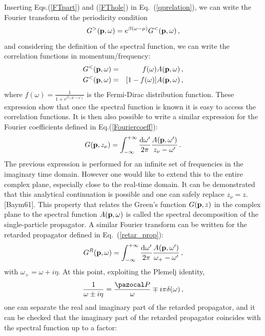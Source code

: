 Inserting Eqs.(\ref{FTpart}) and (\ref{FThole}) in Eq.~(\ref{qprelation}), we can write the Fourier transform of the periodicity condition
\begin{equation}
G^>({\bf p},\omega)=e^{\beta(\omega-\mu)}G^<({\bf p},\omega)\,,
\end{equation}
and considering the definition of the spectral function, we can write the correlation functions in momentum/frequency:
\begin{eqnarray}
\label{FTpart}
G^<({\bf p},\omega) &=& f(\omega)A({\bf p},\omega)\,,\\
\label{FThole}
G^<({\bf p},\omega) &=&[1-f(\omega)]A({\bf p},\omega)\,,
\end{eqnarray}
where $f(\omega)=\frac{1}{1+e^{\beta(\mu-\omega)}}$ is the Fermi-Dirac distribution function. These expression show that once the spectral function is known it is easy to access the correlation functions. It is then also possible to write a similar expression for the Fourier coefficients defined in Eq.(\ref{Fouriercoeff}):
 \begin{equation}
\label{FT_fullprop}
G({\bf p},z_\nu)=\int^{+\infty}_{-\infty} \frac{{\rm d}\omega'}{2\pi} \frac{A({\bf p},\omega')}{z_\nu-\omega'}\,.
\end{equation}
The previous expression is performed for an infinite set of frequencies in the imaginary time domain. However one would like to extend this to the entire complex plane, especially close to the real-time domain. It can be demonstrated that this analytical continuation is possible and one can safely replace $z_\nu=z$. [Baym61]. This property that relates the Green's function $G({\bf p},z)$ in the complex plane to the spectral function $A({\bf p},\omega)$ is called the spectral decomposition of the single-particle propagator. A similar Fourier transform can be written for the retarded propagator defined in Eq.~(\ref{retar_prop}):
 \begin{equation}
\label{FT_retarprop}
G^R({\bf p},\omega)=\int^{+\infty}_{-\infty} \frac{{\rm d}\omega'}{2\pi} \frac{A({\bf p},\omega')}{\omega_+-\omega'}\,,
\end{equation}
with $\omega_+=\omega+i\eta$. At this point, exploiting the Plemelj identity,
\begin{equation}
\frac{1}{\omega\pm i\eta}=\frac{\pazocal P}{\omega}\mp i\pi\delta(\omega)\,,
\end{equation}
one can separate the real and imaginary part of the retarded propagator, and it can be checked that the imaginary part of the retarded propagator coincides with the spectral function up to a factor:
